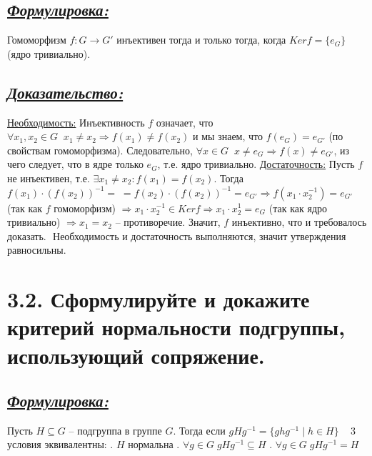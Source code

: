 \documentclass{article}
\begin{document}
\subsection*{\Large \underline{\textit{Формулировка: }}}
Гомоморфизм $f : G \rightarrow G'$ инъективен тогда и только тогда, когда $Kerf = \{e_G\}$ (ядро тривиально).

\subsection*{\Large \underline{\textit{Доказательство: }}}

$ $\indent\underline{Необходимость:}
\newline Инъективность $f$ означает, что $\forall x_1, x_2 \in G \;\; x_1 \ne x_2 \Rightarrow f(x_1) \ne f(x_2)$ и мы знаем, что $f(e_G) = e_{G'}$ (по свойствам гомоморфизма). Следовательно, \newline $\forall x \in G \;\; x \ne e_G \Rightarrow f(x) \ne e_{G'}$, из чего следует, что в ядре только $e_G$, т.е. ядро тривиально.
\newline \indent \underline{Достаточность:}
\newline Пусть $f$ не инъективен, т.е. $\exists x_1 \ne x_2 : f(x_1) = f(x_2)$. Тогда $f(x_1) \cdot (f(x_2))^{-1} = \; = f(x_2) \cdot (f(x_2))^{-1} = e_{G'} \Rightarrow f(x_1 \cdot x_2^{-1}) = e_{G'}$ (так как $f$ гомоморфизм) $\Rightarrow x_1\cdot x_2^{-1} \in Kerf \Rightarrow x_1\cdot x_2^1 = e_{G}$ (так как ядро тривиально) $\Rightarrow x_1 = x_2$ -- противоречие. Значит, $f$ инъективно, что и требовалось доказать.
\newline $ $
\newline Необходимость и достаточность выполняются, значит утверждения равносильны.

\section*{\LARGE 3.2. Сформулируйте и докажите критерий нормальности подгруппы, использующий сопряжение. }
\subsection*{\Large \underline{\textit{Формулировка: }}}
Пусть $H \subseteq G$ -- подгруппа в группе $G$. Тогда если $gHg^{-1} = \{ghg^{-1}\;|\;h\in H\}\;\;\;$ 3 условия эквивалентны:
\newline {}. $H$ нормальна
\newline {}. $\forall g \in G \; gHg^{-1} \subseteq H $
\newline {}. $\forall g \in G \; gHg^{-1} = H $
\end{document}
